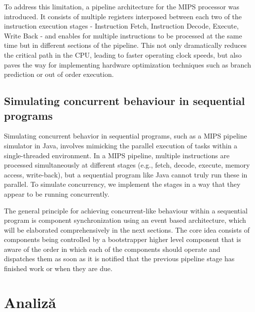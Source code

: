 \documentclass{article}
\begin{document}
To address this limitation, a pipeline architecture for the MIPS processor was introduced. It consists of multiple registers interposed between each two of the instruction execution stages - Instruction Fetch, Instruction Decode, Execute, Write Back - and enables for multiple instructions to be processed at the same time but in different sections of the pipeline. This not only dramatically reduces the critical path in the CPU, leading to faster operating clock speeds, but also paves the way for implementing hardware optimization techniques such as branch prediction or out of order execution.

\subsection{Simulating concurrent behaviour in sequential programs}
Simulating concurrent behavior in sequential programs, such as a MIPS pipeline simulator in Java, involves mimicking the parallel execution of tasks within a single-threaded environment. In a MIPS pipeline, multiple instructions are processed simultaneously at different stages (e.g., fetch, decode, execute, memory access, write-back), but a sequential program like Java cannot truly run these in parallel. To simulate concurrency, we implement the stages in a way that they appear to be running concurrently.

The general principle for achieving concurrent-like behaviour within a sequential program is component synchronization using an event based architecture, which will be elaborated comprehensively in the next sections. The core idea consists of components being controlled by a bootstrapper higher level component that is aware of the order in which each of the components should operate and dispatches them as soon as it is notified that the previous pipeline stage has finished work or when they are due.

\newpage
\section{Analiză}
\end{document}
